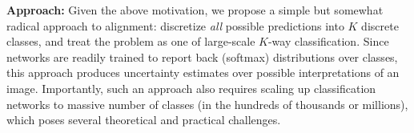 \documentclass[letterpaper]{article} %
\begin{document}
{\bf Approach:} Given the above motivation, we propose a simple but somewhat radical approach to alignment: discretize {\em all} possible predictions into $K$ discrete classes, and treat the problem as one of large-scale $K$-way classification. Since networks are readily trained to report back (softmax) distributions over classes, this approach produces uncertainty estimates over possible interpretations of an image. Importantly, such an approach also requires scaling up classification networks to massive number of classes (in the hundreds of thousands or millions), which poses several theoretical and practical challenges. 
\end{document}
